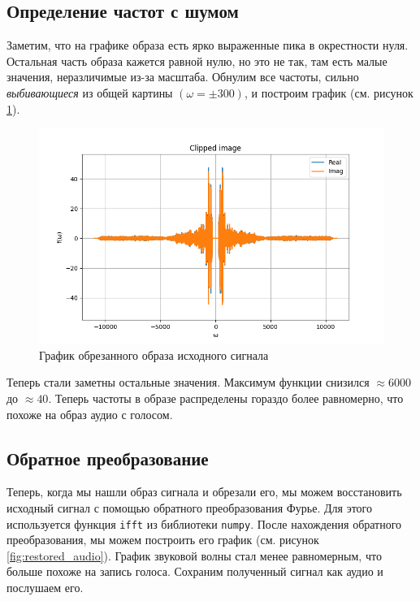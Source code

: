 \FloatBarrier
\subsection{Определение частот с шумом}
Заметим, что на графике образа есть ярко выраженные пика в окрестности нуля. Остальная часть образа кажется равной нулю, но это не так, там есть малые значения, неразличимые из-за масштаба. 
Обнулим все частоты, сильно \textit{выбивающиеся} из общей картины $(\omega = \pm 300)$, и построим график (см. рисунок \ref{fig:clipped_image}).

\begin{figure}
    \centering
    \includegraphics[width=\textwidth]{../results/Clipped image.png}
    \caption{График обрезанного образа исходного сигнала}
    \label{fig:clipped_image}
\end{figure}

Теперь стали заметны остальные значения. Максимум функции снизился $\approx 6000$ до $\approx 40$. Теперь частоты в образе распределены гораздо более равномерно, что похоже на образ аудио с голосом. 

\subsection{Обратное преобразование}

Теперь, когда мы нашли образ сигнала и обрезали его, мы можем восстановить исходный сигнал с помощью обратного преобразования Фурье. Для этого используется функция \texttt{ifft} из библиотеки \texttt{numpy}. 
После нахождения обратного преобразования, мы можем построить его график (см. рисунок \ref{fig:restored_audio}). 
График звуковой волны стал менее равномерным, что больше похоже на запись голоса. Сохраним полученный сигнал как аудио и послушаем его. 

